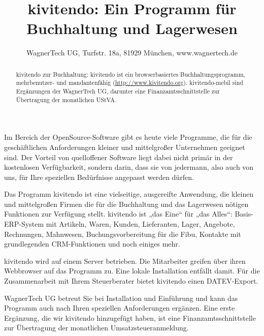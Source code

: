\documentclass{scrartcl}
\title{kivitendo: Ein Programm für Buchhaltung und Lagerwesen}
\author{WagnerTech UG, Turfstr. 18a, 81929 München, www.wagnertech.de}
\date{\vspace{-5ex}}
\begin{document}
\maketitle

\begin{abstract}
kivitendo zur Buchhaltung: kivitendo ist ein browserbasiertes Buchhaltungsprogramm, mehrbenutzer- und mandantenfähig (\url{http://www.kivitendo.org}). kivitendo-mebil sind Ergänzungen der WagnerTech UG, darunter eine Finanzamtsschnittstelle zur Übertragung
der monatlichen UStVA.

\end{abstract}

\begin{multicols}{2}
Im Bereich der OpenSource-Software gibt es heute viele Programme, die für die geschäftlichen Anforderungen kleiner und mittelgroßer Unternehmen geeignet sind. Der Vorteil von quelloffener Software liegt dabei nicht primär in der kostenlosen Verfügbarkeit, sondern darin, dass sie von jedermann, also auch von uns, für Ihre speziellen Bedürfnisse angepasst werden dürfen.

Das Programm kivitendo ist eine vielseitige, ausgereifte Anwendung, die kleinen und mittelgroßen Firmen
die für die Buchhaltung und das Lagerwesen nötigen Funktionen zur Verfügung stellt. kivitendo ist „das Eine“ für „das Alles“: Basis-ERP-System mit Artikeln, Waren, Kunden, Lieferanten, Lager, Angebote, Rechnungen, Mahnwesen, Buchungsvorbereitung für die Fibu, Kontakte mit grundlegenden CRM-Funktionen und noch einiges mehr.

kivitendo wird auf einem Server betrieben. Die Mitarbeiter greifen über ihren Webbrowser auf das Programm zu. Eine lokale
Installation entfällt damit.
Für die Zusammenarbeit mit Ihrem Steuerberater bietet kivitendo einen DATEV-Export.

WagnerTech UG betreut Sie bei Installation und Einführung und kann das Programm auch nach Ihren speziellen Anforderungen
ergänzen. Eine erste Ergänzung, die wir kivitendo hinzugefügt haben, ist eine Finanzamtsschnittstelle zur Übertragung der
monatlichen Umsatzsteueranmeldung.
\end{multicols}

\begin{figure} [h]
   \centering
   \label{abb:screenshot}
\end{figure}
\end{document}
